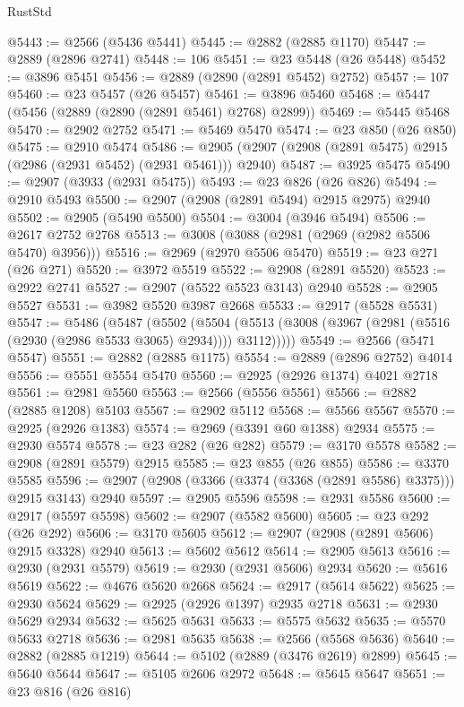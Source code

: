 \begin{lexlean}{RustStd}
\begin{coremodule}
@5443 := @2566 (@5436 @5441)
@5445 := @2882 (@2885 @1170)
@5447 := @2889 (@2896 @2741)
@5448 := 106
@5451 := @23 @5448 (@26 @5448)
@5452 := @3896 @5451
@5456 := @2889 (@2890 (@2891 @5452) @2752)
@5457 := 107
@5460 := @23 @5457 (@26 @5457)
@5461 := @3896 @5460
@5468 := @5447 (@5456 (@2889 (@2890 (@2891 @5461) @2768) @2899))
@5469 := @5445 @5468
@5470 := @2902 @2752
@5471 := @5469 @5470
@5474 := @23 @850 (@26 @850)
@5475 := @2910 @5474
@5486 := @2905 (@2907 (@2908 (@2891 @5475) @2915 (@2986 (@2931 @5452) (@2931 @5461))) @2940)
@5487 := @3925 @5475
@5490 := @2907 (@3933 (@2931 @5475))
@5493 := @23 @826 (@26 @826)
@5494 := @2910 @5493
@5500 := @2907 (@2908 (@2891 @5494) @2915 @2975) @2940
@5502 := @2905 (@5490 @5500)
@5504 := @3004 (@3946 @5494)
@5506 := @2617 @2752 @2768
@5513 := @3008 (@3088 (@2981 (@2969 (@2982 @5506 @5470) @3956)))
@5516 := @2969 (@2970 @5506 @5470)
@5519 := @23 @271 (@26 @271)
@5520 := @3972 @5519
@5522 := @2908 (@2891 @5520)
@5523 := @2922 @2741
@5527 := @2907 (@5522 @5523 @3143) @2940
@5528 := @2905 @5527
@5531 := @3982 @5520 @3987 @2668
@5533 := @2917 (@5528 @5531)
@5547 := @5486
    (@5487
      (@5502
        (@5504 (@5513 (@3008 (@3967 (@2981 (@5516 (@2930 (@2986 @5533 @3065) @2934)))) @3112)))))
@5549 := @2566 (@5471 @5547)
@5551 := @2882 (@2885 @1175)
@5554 := @2889 (@2896 @2752) @4014
@5556 := @5551 @5554 @5470
@5560 := @2925 (@2926 @1374) @4021 @2718
@5561 := @2981 @5560
@5563 := @2566 (@5556 @5561)
@5566 := @2882 (@2885 @1208) @5103
@5567 := @2902 @5112
@5568 := @5566 @5567
@5570 := @2925 (@2926 @1383)
@5574 := @2969 (@3391 @60 @1388) @2934
@5575 := @2930 @5574
@5578 := @23 @282 (@26 @282)
@5579 := @3170 @5578
@5582 := @2908 (@2891 @5579) @2915
@5585 := @23 @855 (@26 @855)
@5586 := @3370 @5585
@5596 := @2907 (@2908 (@3366 (@3374 (@3368 (@2891 @5586) @3375))) @2915 @3143) @2940
@5597 := @2905 @5596
@5598 := @2931 @5586
@5600 := @2917 (@5597 @5598)
@5602 := @2907 (@5582 @5600)
@5605 := @23 @292 (@26 @292)
@5606 := @3170 @5605
@5612 := @2907 (@2908 (@2891 @5606) @2915 @3328) @2940
@5613 := @5602 @5612
@5614 := @2905 @5613
@5616 := @2930 (@2931 @5579)
@5619 := @2930 (@2931 @5606) @2934
@5620 := @5616 @5619
@5622 := @4676 @5620 @2668
@5624 := @2917 (@5614 @5622)
@5625 := @2930 @5624
@5629 := @2925 (@2926 @1397) @2935 @2718
@5631 := @2930 @5629 @2934
@5632 := @5625 @5631
@5633 := @5575 @5632
@5635 := @5570 @5633 @2718
@5636 := @2981 @5635
@5638 := @2566 (@5568 @5636)
@5640 := @2882 (@2885 @1219)
@5644 := @5102 (@2889 (@3476 @2619) @2899)
@5645 := @5640 @5644
@5647 := @5105 @2606 @2972
@5648 := @5645 @5647
@5651 := @23 @816 (@26 @816)

\end{coremodule}
\end{lexlean}
